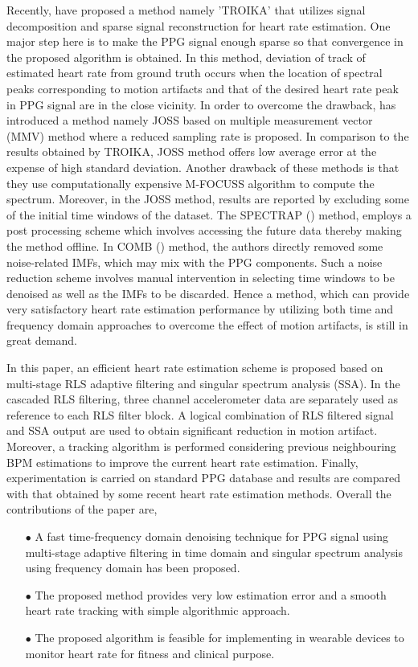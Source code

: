 \documentclass[final,3p,times,authoryear]{elsarticle}
\begin{document}
Recently, \cite{bib:TROIKA} have proposed a method namely 'TROIKA'  that utilizes signal decomposition and sparse signal reconstruction for heart rate estimation. One major step here is to make the PPG signal enough sparse so that convergence in the proposed algorithm is obtained. In this method, deviation of track of estimated heart rate from ground truth occurs when the location of spectral peaks corresponding to motion artifacts and that of the desired heart rate peak in PPG signal are in the close vicinity. In order to overcome the drawback, \cite{bib:JOSS} has introduced a method namely JOSS based on multiple measurement vector (MMV) method where a reduced sampling rate is proposed. In comparison to the results obtained by TROIKA, JOSS method offers low average error at the expense of high standard deviation. Another drawback of these methods is that they use computationally expensive M-FOCUSS algorithm to compute the spectrum. Moreover, in the JOSS method, results are reported by excluding some of the initial time windows of the dataset. The SPECTRAP (\mbox{\cite{bib:SPECTRAP}}) method, employs a post processing scheme which involves accessing the future data thereby making the method offline. In COMB (\mbox{\cite{bib:zhangcomb}}) method, the authors directly removed some noise-related IMFs, which may mix with the PPG components. Such a noise reduction scheme involves manual intervention in selecting time windows to be denoised as well as the IMFs to be discarded. Hence a method, which can provide very satisfactory heart rate estimation performance by utilizing both time and frequency domain approaches to overcome the effect of motion artifacts, is still in great demand.

In this paper, an efficient heart rate estimation scheme is proposed based on multi-stage RLS adaptive filtering and singular spectrum analysis (SSA). In the cascaded RLS filtering, three channel accelerometer data are separately used as reference to each RLS filter block. A logical combination of RLS filtered signal and SSA output are used to obtain significant reduction in motion artifact. Moreover, a tracking algorithm is performed considering previous neighbouring BPM estimations to improve the current heart rate estimation. Finally, experimentation is carried on standard PPG database and results are compared with that obtained by some recent heart rate estimation methods. Overall the contributions of the paper are,
\begin{enumerate}
\item [$\bullet$] A fast time-frequency domain denoising technique for PPG signal using multi-stage adaptive filtering in time domain and singular spectrum analysis using frequency domain has been proposed.
\item [$\bullet$] The proposed method provides very low estimation error and a smooth heart rate tracking with simple algorithmic approach.
\item [$\bullet$] The proposed algorithm is feasible for implementing in wearable devices to monitor heart rate for fitness and clinical purpose.
\end{enumerate}
\end{document}
